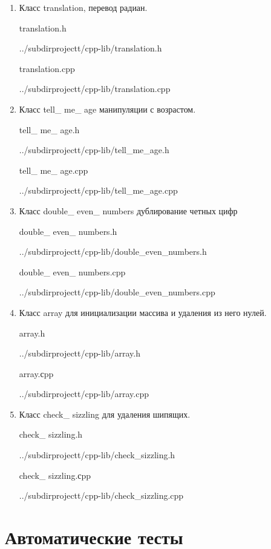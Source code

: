 \documentclass[12pt,a4paper]{report}
\begin{document}
\begin{enumerate}
	\item Класс translation, перевод радиан.
	
	translation.h
	
	{../subdirprojectt/cpp-lib/translation.h}
	
	\vspace{\baselineskip}
	
	translation.cpp
	
	{../subdirprojectt/cpp-lib/translation.cpp}
	
	\item Класс tell\_ me\_ age манипуляции с возрастом.
	
	tell\_ me\_ age.h
	
	{../subdirprojectt/cpp-lib/tell_me_age.h}
	
	\vspace{\baselineskip}
	
	tell\_ me\_ age.cpp
	
	{../subdirprojectt/cpp-lib/tell_me_age.cpp}
	
	\item Класс double\_ even\_ numbers дублирование четных цифр
	
	double\_ even\_ numbers.h
	
	{../subdirprojectt/cpp-lib/double_even_numbers.h}
	
	\vspace{\baselineskip}
	
	double\_ even\_ numbers.cpp
	
	{../subdirprojectt/cpp-lib/double_even_numbers.cpp}
	
	\item Класс array для инициализации массива и удаления из него нулей.
	
	array.h
	
	{../subdirprojectt/cpp-lib/array.h}
	
	array.сpp
	
	{../subdirprojectt/cpp-lib/array.cpp}	
	
	\item 	Класс check\_ sizzling для удаления шипящих.
		
	check\_ sizzling.h
	
	{../subdirprojectt/cpp-lib/check_sizzling.h}
	
	check\_ sizzling.сpp
	
	{../subdirprojectt/cpp-lib/check_sizzling.cpp}	
	
\end{enumerate}


\section{Автоматические тесты}

	
	
	
	
\end{document}
